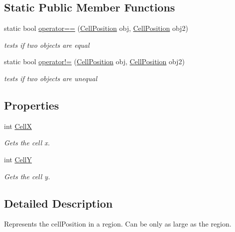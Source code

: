 \subsection*{Static Public Member Functions}
\begin{DoxyCompactItemize}
\item 
static bool \hyperlink{classCore_1_1Models_1_1CellPosition_ab477073a5c715c0d25fa2499c7c9582f}{operator==} (\hyperlink{classCore_1_1Models_1_1CellPosition}{Cell\+Position} obj, \hyperlink{classCore_1_1Models_1_1CellPosition}{Cell\+Position} obj2)
\begin{DoxyCompactList}\small\item\em tests if two objects are equal \end{DoxyCompactList}\item 
static bool \hyperlink{classCore_1_1Models_1_1CellPosition_a922b6be828c0a7fa2fe1f340854d3d6f}{operator!=} (\hyperlink{classCore_1_1Models_1_1CellPosition}{Cell\+Position} obj, \hyperlink{classCore_1_1Models_1_1CellPosition}{Cell\+Position} obj2)
\begin{DoxyCompactList}\small\item\em tests if two objects are unequal \end{DoxyCompactList}\end{DoxyCompactItemize}
\subsection*{Properties}
\begin{DoxyCompactItemize}
\item 
int \hyperlink{classCore_1_1Models_1_1CellPosition_a4daf526cdfe22a21d679d3e1b032d096}{Cell\+X}
\begin{DoxyCompactList}\small\item\em Gets the cell x. \end{DoxyCompactList}\item 
int \hyperlink{classCore_1_1Models_1_1CellPosition_a91ba33cce7deac7d2ec875812c3f73dc}{Cell\+Y}
\begin{DoxyCompactList}\small\item\em Gets the cell y. \end{DoxyCompactList}\end{DoxyCompactItemize}


\subsection{Detailed Description}
Represents the cell\+Position in a region. Can be only as large as the region. 



